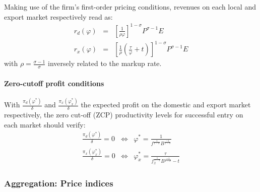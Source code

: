 \documentclass[a4paper,11pt]{article}
\begin{document}
Making use of the firm's first-order pricing conditions, revenues on each local and export market respectively read as:
\begin{eqnarray}
  r_d(\varphi) &=& \left[\frac{1}{\rho \varphi}  \right]^{1-\sigma} P^{\sigma-1} E \label{eq:rd}\\
  r_x(\varphi) &=& \left[\frac{1}{\rho}\left(\frac{\tau}{\varphi} +t\right)  \right]^{1-\sigma} P^{\sigma-1} E \label{eq:rx}
\end{eqnarray}
\noindent with $\rho =  \frac{\sigma-1}{\sigma}$ inversely related to the markup rate.

\paragraph{Zero-cutoff profit conditions} With $\frac{\pi_d(\varphi^\ast)}{\delta}$ and  $\frac{\pi_x(\varphi_x^\ast)}{\delta}$ the expected profit on the domestic and export market respectively, the zero cut-off (ZCP) productivity levels for successful entry on each market should verify:
\begin{eqnarray*}
\frac{\pi_d(\varphi^\ast)}{\delta} = 0 &\Leftrightarrow & \varphi^\ast = \frac{1}{f^{\frac{1}{1-\sigma}}B^{\frac{-1}{1-\sigma}}}\\
\frac{\pi_x(\varphi_x^\ast)}{\delta} = 0 &\Leftrightarrow & \varphi_x^\ast = \frac{\tau}{f_x^{\frac{1}{1-\sigma}}B^{\frac{-1}{1-\sigma}} -t}
\end{eqnarray*}

\subsubsection{Aggregation: Price indices}
\end{document}
